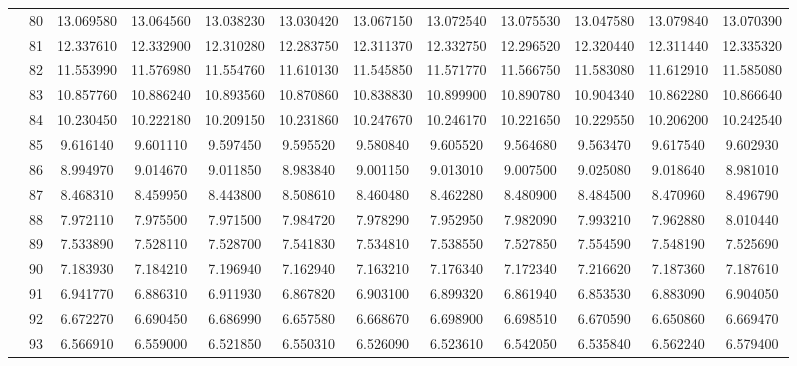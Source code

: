 \begin{table}[h]
{\begin{tabular}{cc|cccccccccc}
\multicolumn{1}{|c|}{} & 80 & 13.069580 & 13.064560 & 13.038230 & 13.030420 & 13.067150 & 13.072540 & 13.075530 & 13.047580 & 13.079840 & 13.070390 \\ \cline{2-2}
\multicolumn{1}{|c|}{} & 81 & 12.337610 & 12.332900 & 12.310280 & 12.283750 & 12.311370 & 12.332750 & 12.296520 & 12.320440 & 12.311440 & 12.335320 \\ \cline{2-2}
\multicolumn{1}{|c|}{} & 82 & 11.553990 & 11.576980 & 11.554760 & 11.610130 & 11.545850 & 11.571770 & 11.566750 & 11.583080 & 11.612910 & 11.585080 \\ \cline{2-2}
\multicolumn{1}{|c|}{} & 83 & 10.857760 & 10.886240 & 10.893560 & 10.870860 & 10.838830 & 10.899900 & 10.890780 & 10.904340 & 10.862280 & 10.866640 \\ \cline{2-2}
\multicolumn{1}{|c|}{} & 84 & 10.230450 & 10.222180 & 10.209150 & 10.231860 & 10.247670 & 10.246170 & 10.221650 & 10.229550 & 10.206200 & 10.242540 \\ \cline{2-2}
\multicolumn{1}{|c|}{} & 85 & 9.616140 & 9.601110 & 9.597450 & 9.595520 & 9.580840 & 9.605520 & 9.564680 & 9.563470 & 9.617540 & 9.602930 \\ \cline{2-2}
\multicolumn{1}{|c|}{} & 86 & 8.994970 & 9.014670 & 9.011850 & 8.983840 & 9.001150 & 9.013010 & 9.007500 & 9.025080 & 9.018640 & 8.981010 \\ \cline{2-2}
\multicolumn{1}{|c|}{} & 87 & 8.468310 & 8.459950 & 8.443800 & 8.508610 & 8.460480 & 8.462280 & 8.480900 & 8.484500 & 8.470960 & 8.496790 \\ \cline{2-2}
\multicolumn{1}{|c|}{} & 88 & 7.972110 & 7.975500 & 7.971500 & 7.984720 & 7.978290 & 7.952950 & 7.982090 & 7.993210 & 7.962880 & 8.010440 \\ \cline{2-2}
\multicolumn{1}{|c|}{} & 89 & 7.533890 & 7.528110 & 7.528700 & 7.541830 & 7.534810 & 7.538550 & 7.527850 & 7.554590 & 7.548190 & 7.525690 \\ \cline{2-2}
\multicolumn{1}{|c|}{} & 90 & 7.183930 & 7.184210 & 7.196940 & 7.162940 & 7.163210 & 7.176340 & 7.172340 & 7.216620 & 7.187360 & 7.187610 \\ \cline{2-2}
\multicolumn{1}{|c|}{} & 91 & 6.941770 & 6.886310 & 6.911930 & 6.867820 & 6.903100 & 6.899320 & 6.861940 & 6.853530 & 6.883090 & 6.904050 \\ \cline{2-2}
\multicolumn{1}{|c|}{} & 92 & 6.672270 & 6.690450 & 6.686990 & 6.657580 & 6.668670 & 6.698900 & 6.698510 & 6.670590 & 6.650860 & 6.669470 \\ \cline{2-2}
\multicolumn{1}{|c|}{} & 93 & 6.566910 & 6.559000 & 6.521850 & 6.550310 & 6.526090 & 6.523610 & 6.542050 & 6.535840 & 6.562240 & 6.579400 \\ \cline{2-2}

\end{tabular}}
\end{table}
